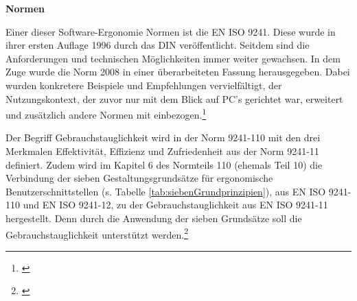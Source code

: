\textbf{Normen}

Einer dieser Software-Ergonomie Normen ist die \gls{EN} \gls{ISO} 9241. Diese wurde in ihrer ersten Auflage 1996 durch das \gls{DIN} veröffentlicht. Seitdem sind die Anforderungen und technischen Möglichkeiten immer weiter gewachsen. In dem Zuge wurde die Norm 2008 in einer überarbeiteten Fassung herausgegeben. Dabei wurden konkretere Beispiele und Empfehlungen vervielfältigt, der Nutzungskontext, der zuvor nur mit dem Blick auf PC's gerichtet war, erweitert und zusätzlich andere Normen mit einbezogen.\footnote{\cite[vgl.][5\psqq]{Schneider2008}}

Der Begriff Gebrauchstauglichkeit wird in der Norm 9241-110 mit den drei Merkmalen Effektivität, Effizienz und Zufriedenheit aus der Norm 9241-11 definiert. Zudem wird im Kapitel 6 des Normteils 110 (ehemals Teil 10) die Verbindung der sieben Gestaltungsgrundsätze für ergonomische Benutzerschnittstellen (s. Tabelle \ref{tab:siebenGrundprinzipien}), aus EN ISO 9241-110 und EN ISO 9241-12, zu der Gebrauchstauglichkeit aus EN ISO 9241-11 hergestellt. Denn durch die Anwendung der sieben Grundsätze soll die Gebrauchstauglichkeit unterstützt werden.\footnote{\cite[vgl.][Kap. 6]{ISO9241-110}}

